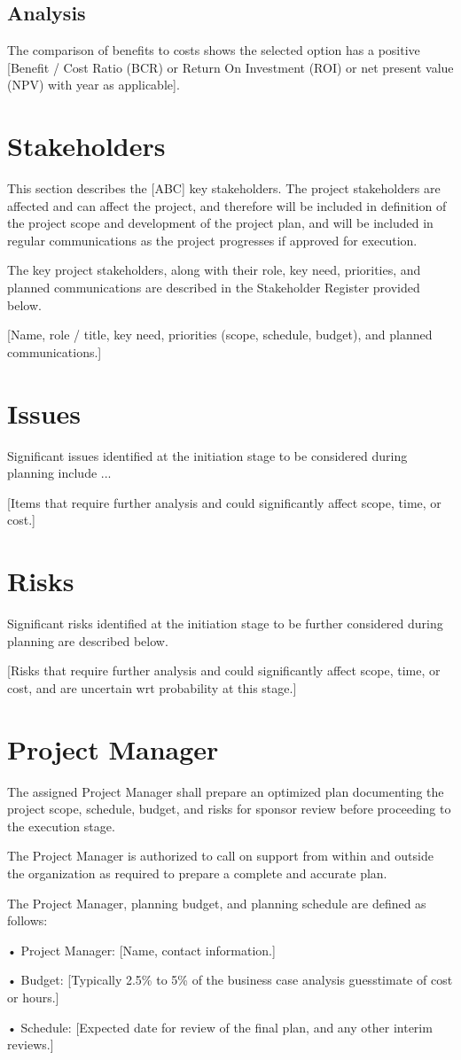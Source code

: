 \documentclass[11pt,letterpaper]{article}
\begin{document}
\subsection{Analysis}
The comparison of benefits to costs shows the selected option has a positive [Benefit / Cost Ratio (BCR) or Return On Investment (ROI) or net present value (NPV) with year as applicable].

\section{Stakeholders}
This section describes the [ABC] key stakeholders.  The project stakeholders are affected and can affect the project, and therefore will be included in definition of the project scope and development of the project plan, and will be included in regular communications as the project progresses if approved for execution.

The key project stakeholders, along with their role, key need, priorities, and planned communications are described in the Stakeholder Register provided below.

    [Name, role / title, key need, priorities (scope, schedule, budget), and planned communications.]

\section{Issues}
Significant issues identified at the initiation stage to be considered during planning include ...

    [Items that require further analysis and could significantly affect scope, time, or cost.]

\section{Risks}
Significant risks identified at the initiation stage to be further considered during planning are described below.

    [Risks that require further analysis and could significantly affect scope, time, or cost, and are uncertain wrt probability at this stage.]

\section{Project Manager}
The assigned Project Manager shall prepare an optimized plan documenting the project scope, schedule, budget, and risks for sponsor review before proceeding to the execution stage.

The Project Manager is authorized to call on support from within and outside the organization as required to prepare a complete and accurate plan.

The Project Manager, planning budget, and planning schedule are defined as follows:

• Project Manager:  [Name, contact information.]

• Budget:  [Typically 2.5\% to 5\% of the business case analysis guesstimate of cost or hours.]

• Schedule:  [Expected date for review of the final plan, and any other interim reviews.]
\end{document}
